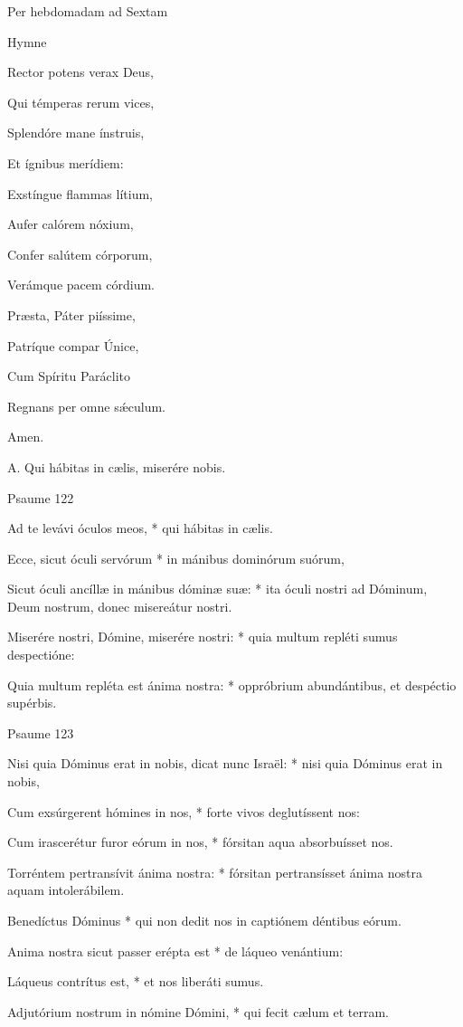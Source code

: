 Per hebdomadam ad Sextam

Hymne

Rector potens verax Deus,

Qui témperas rerum vices,

Splendóre mane ínstruis,

Et ígnibus merídiem:


Exstíngue flammas lítium,

Aufer calórem nóxium,

Confer salútem córporum,

Verámque pacem córdium.


Præsta, Páter piíssime,

Patríque compar Únice,

Cum Spíritu Paráclito

Regnans per omne sǽculum.

Amen.


A. Qui hábitas in cælis, miserére nobis.


Psaume 122

Ad te levávi óculos meos, * qui hábitas in cælis.

Ecce, sicut óculi servórum * in mánibus dominórum suórum,

Sicut óculi ancíllæ in mánibus dóminæ suæ: * ita óculi nostri ad Dóminum, Deum nostrum, donec misereátur nostri.

Miserére nostri, Dómine, miserére nostri: * quia multum repléti sumus despectióne:

Quia multum repléta est ánima nostra: * oppróbrium abundántibus, et despéctio supérbis.


Psaume 123

Nisi quia Dóminus erat in nobis, dicat nunc Israël: * nisi quia Dóminus erat in nobis,

Cum exsúrgerent hómines in nos, * forte vivos deglutíssent nos:

Cum irascerétur furor eórum in nos, * fórsitan aqua absorbuísset nos.

Torréntem pertransívit ánima nostra: * fórsitan pertransísset ánima nostra aquam intolerábilem.

Benedíctus Dóminus * qui non dedit nos in captiónem déntibus eórum.

Anima nostra sicut passer erépta est * de láqueo venántium:

Láqueus contrítus est, * et nos liberáti sumus.

Adjutórium nostrum in nómine Dómini, * qui fecit cælum et terram.


